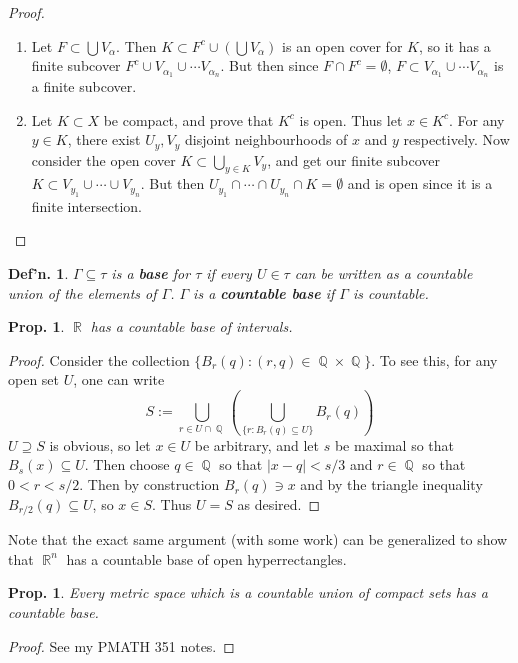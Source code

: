 \documentclass[12pt, a4paper]{book}
\DeclareMathOperator{\Q}{\mathbb{Q}}
\DeclareMathOperator{\R}{\mathbb{R}}
\newtheorem{definition}[theorem]{Def'n.}
\newtheorem{proposition}[theorem]{Prop.}
\theoremstyle{nonumberplain}
\newtheorem{proof}{Proof}
\begin{document}
\begin{proof}
    \begin{enumerate}[nolistsep]
        \item Let $F\subset\bigcup V_\alpha$.
            Then $K\subset F^c\cup \left(\bigcup V_\alpha\right)$ is an open cover for $K$, so it has a finite subcover $F^c\cup V_{\alpha_1}\cup\cdots V_{\alpha_n}$.
            But then since $F\cap F^c=\emptyset$, $F\subset V_{\alpha_1}\cup\cdots V_{\alpha_n}$ is a finite subcover.
        \item Let $K\subset X$ be compact, and prove that $K^c$ is open.
            Thus let $x\in K^c$.
            For any $y\in K$, there exist $U_y,V_y$ disjoint neighbourhoods of $x$ and $y$ respectively.
            Now consider the open cover $K\subset\bigcup_{y\in K}V_y$, and get our finite subcover $K\subset V_{y_1}\cup\cdots\cup V_{y_n}$.
            But then $U_{y_1}\cap\cdots\cap U_{y_n}\cap K=\emptyset$ and is open since it is a finite intersection.
    \end{enumerate}
\end{proof}
\begin{definition}
    $\Gamma\subseteq\tau$ is a \textbf{base} for $\tau$ if every $U\in\tau$ can be written as a countable union of the elements of $\Gamma$.
    $\Gamma$ is a \textbf{countable base} if $\Gamma$ is countable.
\end{definition}
\begin{proposition}
    $\R$ has a countable base of intervals.
\end{proposition}
\begin{proof}
    Consider the collection $\{B_{r}(q):(r,q)\in\Q\times\Q\}$.
    To see this, for any open set $U$, one can write
    \[S:=\bigcup\limits_{r\in U\cap\Q} \left(\bigcup\limits_{\{r:B_{r}(q)\subseteq U\}}B_{r}(q)\right)\]
    $U\supseteq S$ is obvious, so let $x\in U$ be arbitrary, and let $s$ be maximal so that $B_s(x)\subseteq U$.
    Then choose $q\in\Q$ so that $|x-q|<s/3$ and $r\in\Q$ so that $0<r<s/2$.
    Then by construction $B_{r}(q)\ni x$ and by the triangle inequality $B_{r/2}(q)\subseteq U$, so $x\in S$.
    Thus $U=S$ as desired.
\end{proof}
Note that the exact same argument (with some work) can be generalized to show that $\R^n$ has a countable base of open hyperrectangles.
\begin{proposition}
    Every metric space which is a countable union of compact sets has a countable base.
\end{proposition}
\begin{proof}
    See my PMATH 351 notes.
\end{proof}
\end{document}
